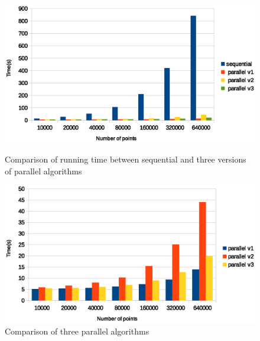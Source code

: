 \begin{figure}[!h]
  \centering
  \begin{minipage}{.8\textwidth}
    \includegraphics[width=\linewidth]{fig/all_comparison}
    \caption{Comparison of running time between sequential and three versions of parallel algorithms}
    \label{fig:all}
  \end{minipage}
  \begin{minipage}{.8\textwidth}
    \includegraphics[width=\linewidth]{fig/parallel_algorithm_comparison}
    \caption{Comparison of three parallel algorithms}
    \label{fig:par}
  \end{minipage}
\end{figure}
